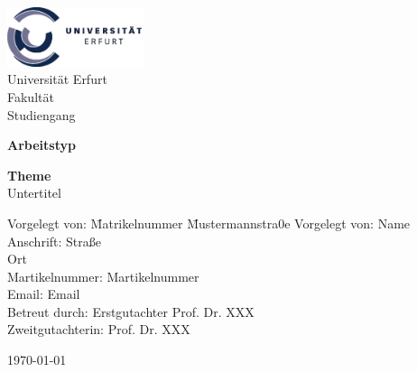 \documentclass[
	a4paper,%
	oneside,%
	12pt,%
	halfparskip,%
	headinclude,%
	headsepline,%
	plainheadsepline,
	footsepline, %
	plainfootsepline,
	bibtotoc,%
	liststotoc,%
	toc=bibliography,
	]{scrbook}
\date{\today}
\begin{document}


\begin{titlepage}
 \thispagestyle{empty}
  \includegraphics[width=0.30\textwidth]{pics/Logo_Universitaet_Erfurt.png}\\
	Universität Erfurt \\
	Fakultät \\
	Studiengang

	\vfill{}

	\begin{center}
			\Huge\textbf{Arbeitstyp}
	\end{center}

	\begin{center}
			\Huge\textbf{Theme} \\
			\Large Untertitel
	\end{center}

	\vfill{}

\begin{tabbing}
	Vorgelegt von:\hspace{0.5em} \= Matrikelnummer\hspace{0.7em} \=  Mustermannstra0e \kill
	Vorgelegt von: \+\> Name\\
		Anschrift: \+\> Straße \\
		\-Ort \\
	Martikelnummer: \> Martikelnummer \\
	\-Email: \> Email \\[2ex]
	Betreut durch: \+\> Erstgutachter \> Prof. Dr. XXX \\
						Zweitgutachterin: \> Prof. Dr. XXX \\
\end{tabbing}

\vspace{5ex}

\today{}

\end{titlepage}
\end{document}
